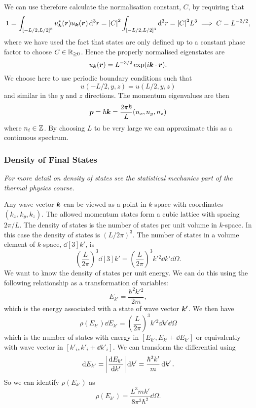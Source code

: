 \documentclass[a4paper]{article}
\begin{document}
    We can use therefore calculate the normalisation constant, \(C\), by requiring that
    \[1 = \int_{[-L/2, L/2]^{3}} u_{\bm{k}}^*(\bm{r}) u_{\bm{k}}(\bm{r}) \dd[3]{r} = \abs{C}^2 \int_{[-L/2, L/2]^3} \dd[3]{r} = \abs{C}^2L^3 \implies C = L^{-3/2},\]
    where we have used the fact that states are only defined up to a constant phase factor to choose \(C \in \mathbb{R}_{\ge 0}\).
    Hence the properly normalised eigenstates are
    \[u_{\bm{k}}(\bm{r}) = L^{-3/2} \exp(i\bm{k}\cdot\bm{r}).\]
    We choose here to use periodic boundary conditions such that
    \[u(-L/2, y, z) = u(L/2, y, z)\]
    and similar in the \(y\) and \(z\) directions.
    The momentum eigenvalues are then
    \[\bm{p} = \hbar\bm{k} = \frac{2\pi\hbar}{L}(n_{x}, n_{y}, n_{z})\]
    where \(n_i \in \mathbb{Z}\).
    By choosing \(L\) to be very large we can approximate this as a continuous spectrum.
    
    \subsubsection{Density of Final States}
    \textit{For more detail on density of states see the statistical mechanics part of the thermal physics course.}
    
    Any wave vector \(\bm{k}\) can be viewed as a point in \(k\)-space with coordinates \((k_x, k_y, k_z)\).
    The allowed momentum states form a cubic lattice with spacing \(2\pi/L\).
    The density of states is the number of states per unit volume in \(k\)-space.
    In this case the density of states is \((L/2\pi)^3\).
    The number of states in a volume element of \(k\)-space, \(\dd[3]{k'}\), is
    \[\left( \frac{L}{2\pi} \right)^3 \dd[3]{k'} = \left( \frac{L}{2\pi} \right)^3 k'{^2} \dd{k'}\dd{\Omega}.\]
    We want to know the density of states per unit energy.
    We can do this using the following relationship as a transformation of variables:
    \[E_{k'} = \frac{\hbar^2 k'{^2}}{2m},\]
    which is the energy associated with a state of wave vector \(\bm{k'}\).
    We then have
    \[\rho(E_{k'})\dd{E_{k'}} = \left( \frac{L}{2\pi} \right)^3 k'{^2}\dd{k'}\dd{\Omega}\]
    which is the number of states with energy in \([E_{k'}, E_{k'} + \dd{E_{k'}}]\) or equivalently with wave vector in \([k'_{i}, k'_{i} + \dd{k'_i}]\).
    We can transform the differential using
    \[\dd{E_{k'}} = \abs{\dv{E_{k'}}{k'}}\dd{k'} = \frac{\hbar^2k'}{m}\dd{k'}.\]
    So we can identify \(\rho(E_{k'})\) as
    \[\rho(E_{k'}) = \frac{L^3mk'}{8\pi^3\hbar^2}\dd{\Omega}.\]
    
\end{document}
